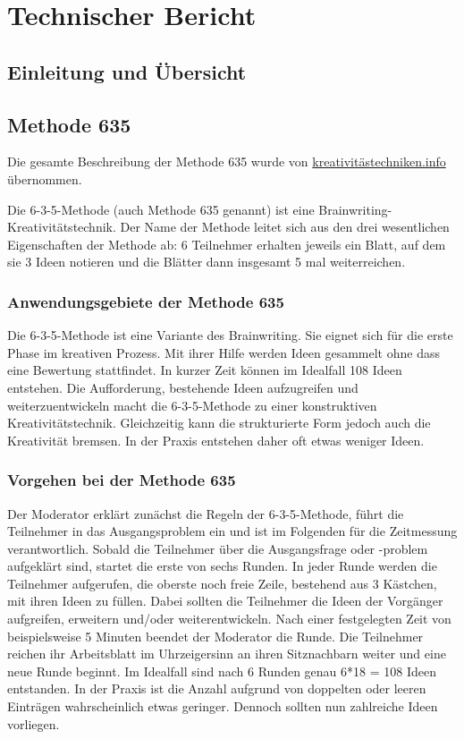 \section{Technischer Bericht}

\subsection{Einleitung und Übersicht}


\subsection{Methode 635}
Die gesamte Beschreibung der Methode 635 wurde von \href{https://kreativitätstechniken.info/6-3-5-methode/}{kreativitästechniken.info} übernommen.


Die 6-3-5-Methode (auch Methode 635 genannt) ist eine Brainwriting-Kre\-ati\-vi\-täts\-technik. Der Name der Methode leitet sich aus den drei wesentlichen Eigenschaften der Methode ab: 6 Teilnehmer erhalten jeweils ein Blatt, auf dem sie 3 Ideen notieren und die Blätter dann insgesamt 5 mal weiterreichen.

\subsubsection*{Anwendungsgebiete der Methode 635}
Die 6-3-5-Methode ist eine Variante des Brainwriting. Sie eignet sich für die erste Phase im kreativen Prozess. Mit ihrer Hilfe werden Ideen gesammelt ohne dass eine Bewertung stattfindet. In kurzer Zeit können im Idealfall 108 Ideen entstehen. Die Aufforderung, bestehende Ideen aufzugreifen und weiterzuentwickeln macht die 6-3-5-Methode zu einer konstruktiven Kreativitätstechnik. Gleichzeitig kann die strukturierte Form jedoch auch die Kreativität bremsen. In der Praxis entstehen daher oft etwas weniger Ideen.

\subsubsection*{Vorgehen bei der Methode 635}
Der Moderator erklärt zunächst die Regeln der 6-3-5-Methode, führt die Teilnehmer in das Ausgangsproblem ein und ist im Folgenden für die Zeitmessung verantwortlich. Sobald die Teilnehmer über die Ausgangsfrage oder -problem aufgeklärt sind, startet die erste von sechs Runden. In jeder Runde werden die Teilnehmer aufgerufen, die oberste noch freie Zeile, bestehend aus 3 Kästchen, mit ihren Ideen zu füllen. Dabei sollten die Teilnehmer die Ideen der Vorgänger aufgreifen, erweitern und/oder weiterentwickeln. Nach einer festgelegten Zeit von beispielsweise 5 Minuten beendet der Moderator die Runde. Die Teilnehmer reichen ihr Arbeitsblatt im Uhrzeigersinn an ihren Sitznachbarn weiter und eine neue Runde beginnt. Im Idealfall sind nach 6 Runden genau 6*18 = 108 Ideen entstanden. In der Praxis ist die Anzahl aufgrund von doppelten oder leeren Einträgen wahrscheinlich etwas geringer. Dennoch sollten nun zahlreiche Ideen vorliegen.


